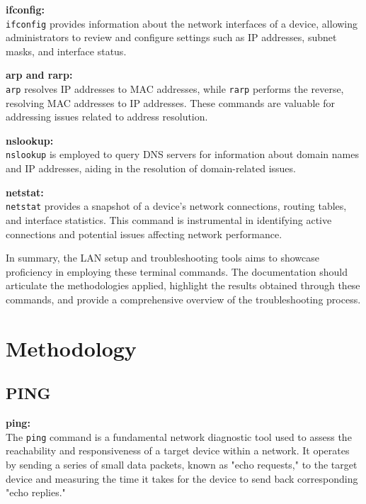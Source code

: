 \documentclass[11pt]{report}
\begin{document}
\textbf{ifconfig:} \\
\texttt{ifconfig} provides information about the network interfaces of a device, allowing administrators to review and configure settings such as IP addresses, subnet masks, and interface status.

\textbf{arp and rarp:} \\
\texttt{arp} resolves IP addresses to MAC addresses, while \texttt{rarp} performs the reverse, resolving MAC addresses to IP addresses. These commands are valuable for addressing issues related to address resolution.

\textbf{nslookup:} \\
\texttt{nslookup} is employed to query DNS servers for information about domain names and IP addresses, aiding in the resolution of domain-related issues.

\textbf{netstat:} \\
\texttt{netstat} provides a snapshot of a device's network connections, routing tables, and interface statistics. This command is instrumental in identifying active connections and potential issues affecting network performance.
\vspace{\baselineskip}

In summary, the LAN setup and troubleshooting tools aims to showcase proficiency in employing these terminal commands. The documentation should articulate the methodologies applied, highlight the results obtained through these commands, and provide a comprehensive overview of the troubleshooting process.

\section{Methodology}

\subsection{PING}
\textbf{ping:} \\
The \texttt{ping} command is a fundamental network diagnostic tool used to assess the reachability and responsiveness of a target device within a network. It operates by sending a series of small data packets, known as "echo requests," to the target device and measuring the time it takes for the device to send back corresponding "echo replies."
\vspace{\baselineskip}
\vspace{\baselineskip}
\vspace{\baselineskip}
\vspace{\baselineskip}
\end{document}
